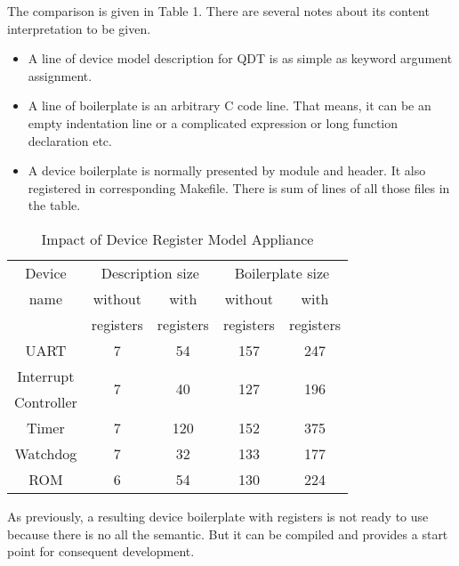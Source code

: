 \documentclass[conference,compsoc,a4paper]{IEEEtran}
\begin{document}
The comparison is given in Table 1.
There are several notes about its content interpretation to be given.

\begin{itemize}
    \item A line of device model description for QDT is as simple as
    keyword argument assignment.
    \item A line of boilerplate is an arbitrary C code line.
    That means, it can be an empty indentation line or a complicated
    expression or long function declaration etc.
    \item A device boilerplate is normally presented by module and header.
    It also registered in corresponding Makefile.
    There is sum of lines of all those files in the table.
\end{itemize}

\def \r#1{\multirow{ 2}{*}{#1}}

\begin{table}[!t]
\renewcommand{\arraystretch}{1.3}
\caption{Impact of Device Register Model Appliance}
\label{table_example}
\centering
\begin{tabular}{|c||c|c||c|c|}
\hline
Device     & \multicolumn{2}{c||}{Description size} & \multicolumn{2}{c|}{Boilerplate size}\\
\cline{2-5}
name       & without    & with       & without   & with \\
           & registers  & registers  & registers & registers\\
\hline
UART       & 7          & 54         & 157       & 247\\
Interrupt  & \r{7}      & \r{40}     & \r{127}   & \r{196}\\
Controller &            &            &           &\\
Timer      & 7          & 120        & 152       & 375\\
Watchdog   & 7          & 32         & 133       & 177\\
ROM        & 6          & 54         & 130       & 224\\
\hline
\end{tabular}
\end{table}

As previously, a resulting device boilerplate with registers is not
ready to use because there is no all the semantic.
But it can be compiled and provides a start point for consequent
development.
\end{document}
